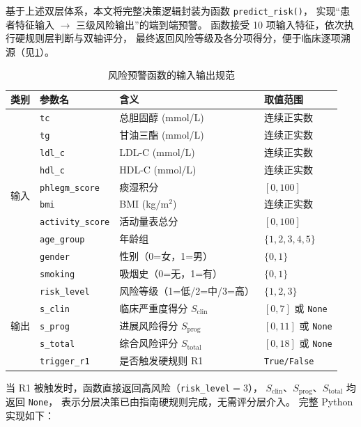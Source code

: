 基于上述双层体系，本文将完整决策逻辑封装为函数 \texttt{predict\_risk()}，
实现``患者特征输入 $\to$ 三级风险输出''的端到端预警。
函数接受 10 项输入特征，依次执行硬规则层判断与双轴评分，
最终返回风险等级及各分项得分，便于临床逐项溯源（见\cref{tab:func-io}）。

\begin{table}[H]
\centering\small
\caption{风险预警函数的输入输出规范}\label{tab:func-io}
\begin{tabular}{@{}l l l l@{}}
\toprule
类别 & 参数名 & 含义 & 取值范围 \\
\midrule
\multirow{10}{*}{输入} 
  & \texttt{tc}             & 总胆固醇 (mmol/L)        & 连续正实数 \\
  & \texttt{tg}             & 甘油三酯 (mmol/L)        & 连续正实数 \\
  & \texttt{ldl\_c}         & LDL-C (mmol/L)           & 连续正实数 \\
  & \texttt{hdl\_c}         & HDL-C (mmol/L)           & 连续正实数 \\
  & \texttt{phlegm\_score}  & 痰湿积分                 & $[0, 100]$ \\
  & \texttt{bmi}            & BMI (kg/m$^2$)           & 连续正实数 \\
  & \texttt{activity\_score}& 活动量表总分             & $[0, 100]$ \\
  & \texttt{age\_group}     & 年龄组                   & $\{1,2,3,4,5\}$ \\
  & \texttt{gender}         & 性别（0=女，1=男）       & $\{0,1\}$ \\
  & \texttt{smoking}        & 吸烟史（0=无，1=有）     & $\{0,1\}$ \\
\midrule
\multirow{5}{*}{输出}
  & \texttt{risk\_level}    & 风险等级（1=低/2=中/3=高）& $\{1,2,3\}$ \\
  & \texttt{s\_clin}        & 临床严重度得分 $S_{\text{clin}}$ & $[0,7]$ 或 \texttt{None} \\
  & \texttt{s\_prog}        & 进展风险得分 $S_{\text{prog}}$   & $[0,11]$ 或 \texttt{None} \\
  & \texttt{s\_total}       & 综合风险评分 $S_{\text{total}}$  & $[0,18]$ 或 \texttt{None} \\
  & \texttt{trigger\_r1}    & 是否触发硬规则 R1        & \texttt{True/False} \\
\bottomrule
\end{tabular}
\end{table}

\noindent 当 R1 被触发时，函数直接返回高风险（\texttt{risk\_level}$=3$），
$S_{\text{clin}}$、$S_{\text{prog}}$、$S_{\text{total}}$ 均返回 \texttt{None}，
表示分层决策已由指南硬规则完成，无需评分层介入。
完整 Python 实现如下：

